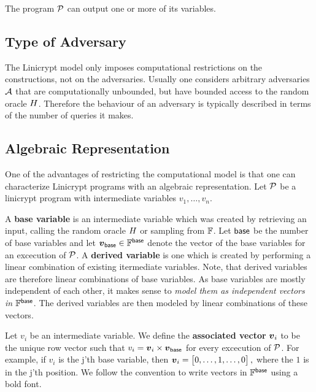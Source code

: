 The program $\P$ can output one or more of its variables.

\subsection{Type of Adversary}
The Linicrypt model only imposes computational restrictions on the constructions,
not on the adversaries.
Usually one considers arbitrary adversaries $\A$ that are computationally unbounded,
but have bounded access to the random oracle $\H$.
Therefore the behaviour of an adversary is typically described in terms of the number of queries it makes.

\subsection{Algebraic Representation}

One of the advantages of restricting the computational model is that one can characterize
Linicrypt programs with an algebraic representation.
Let $\P$ be a linicrypt program with intermediate variables $v_1, \dots, v_n$.

A \textbf{base variable} is an intermediate variable which was created by retrieving an input,
calling the random oracle $\H$ or sampling from $\F$.
Let $\base$ be the number of base variables
and let $\vbase \in \Base$ denote the vector of the base variables for an excecution of $\P$.
A \textbf{derived variable} is one which is created by performing a linear combination of existing itermediate variables.
Note, that derived variables are therefore linear combinations of base variables.
As base variables are mostly independent of each other,
it makes sense to \emph {model them as independent vectors in $\Base$}.
The derived variables are then modeled by linear combinations of these vectors.

Let $v_i$ be an intermediate variable.
We define the \textbf{associated vector} $\v v_i$ to be the unique row vector such that
$v_i = \v v_i \times \vbase$ for every excecution of $\P$.
For example, if $v_i$ is the j'th base variable, then 
$
  \v v_i = \begin{bmatrix}
  0,\dots,1,\dots,0
  \end{bmatrix},
$
where the $1$ is in the j'th position.
We follow the convention to write vectors in $\Base$ using a bold font.


